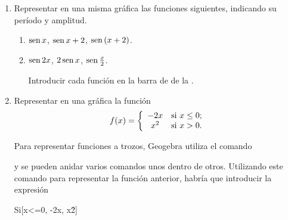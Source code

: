 \begin{enumerate}[leftmargin=*]
\item Representar en una misma gráfica las funciones siguientes, indicando su período y amplitud.
      \begin{enumerate}
      \item $\operatorname{sen}{x}$, $\operatorname{sen}{x}+2$, $\operatorname{sen}{(x+2)}$.
      \item $\operatorname{sen}{2x}$, $2\operatorname{sen}{x}$, $\operatorname{sen}\frac{x}{2}$.
            \begin{indication}
            Introducir cada función en la barra de  de la .
            \end{indication}
      \end{enumerate}


\item Representar en una gráfica la función
      \[
      \ f(x)=\left\{
      \begin{array}{cl}
      -2x   & \hbox{si $x\leq0$;} \\
      x^{2} & \hbox{si $x>0$.}    \\
      \end{array}
      \right.
      \]

      \begin{indication}
      Para representar funciones a trozos, Geogebra utiliza el comando
      \begin{center}
      \end{center}
      y se pueden anidar varios comandos unos dentro de otros. 
      Utilizando este comando para representar la función anterior, habría que introducir la expresión
      \begin{center}
        Si[x<=0, -2x, x\^2]    
      \end{center}
      \end{indication}
\end{enumerate}


